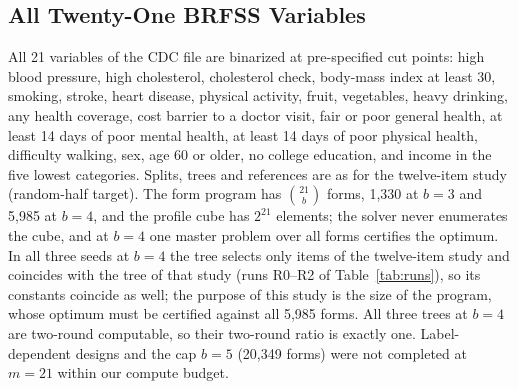 \subsection{All Twenty-One BRFSS Variables}\label{app:scale}
All 21 variables of the CDC file are binarized at pre-specified cut points: high blood pressure, high cholesterol, cholesterol check, body-mass index at least 30, smoking, stroke, heart disease, physical activity, fruit, vegetables, heavy drinking, any health coverage, cost barrier to a doctor visit, fair or poor general health, at least 14 days of poor mental health, at least 14 days of poor physical health, difficulty walking, sex, age 60 or older, no college education, and income in the five lowest categories. Splits, trees and references are as for the twelve-item study (random-half target). The form program has $\binom{21}b$ forms, 1,330 at $b=3$ and 5,985 at $b=4$, and the profile cube has $2^{21}$ elements; the solver never enumerates the cube, and at $b=4$ one master problem over all forms certifies the optimum. In all three seeds at $b=4$ the tree selects only items of the twelve-item study and coincides with the tree of that study (runs R0--R2 of Table~\ref{tab:runs}), so its constants coincide as well; the purpose of this study is the size of the program, whose optimum must be certified against all 5,985 forms. All three trees at $b=4$ are two-round computable, so their two-round ratio is exactly one. Label-dependent designs and the cap $b=5$ (20,349 forms) were not completed at $m=21$ within our compute budget.


